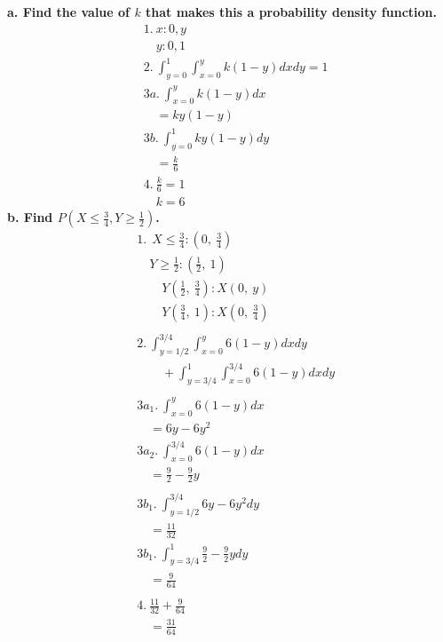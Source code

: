 \documentclass[
	a4paper, %
	10pt, %
	unnumberedsections, %
	twoside, %
]{LTJournalArticle}
\begin{document}
\textbf{a. Find the value of $k$ that makes this a probability density function.}
\begin{equation*}
    \begin{aligned}
    &1. \ x: 0, y \\
    &{\quad} y: 0, 1 \\
    &2. \ \int_{y = 0}^1 \int_{x = 0}^y k(1 - y)dxdy = 1 \\
    &3a. \  \int_{x = 0}^y k(1 - y)dx \\
    &{\quad} = ky(1 - y) \\
    &3b. \  \int_{y = 0}^1 ky(1 - y)dy \\
    &{\quad} = \frac{k}{6} \\
    &4. \  \frac{k}{6} = 1 \\
    &{\quad} k = 6
    \end{aligned}
\end{equation*}
\textbf{b. Find $P(X \le \frac{3}{4}, Y \ge \frac{1}{2})$.}
\begin{equation*}
    \begin{aligned}
    &1. \ \ X \le \frac{3}{4}: \left( 0, \ \frac{3}{4} \right) \\
    &{\quad} Y \ge \frac{1}{2}: \left( \frac{1}{2}, \ 1 \right) \\
    &{\quad \quad} Y \left( \frac{1}{2}, \ \frac{3}{4} \right): X \left( 0, \ y \right) \\
    &{\quad \quad} Y \left( \frac{3}{4}, \ 1 \right): X \left( 0, \ \frac{3}{4} \right) \\ \\
    &2. \ \int_{y = 1/2}^{3/4} \int_{x = 0}^{y} 6(1 - y) dxdy \\
    &{\quad \quad} + \int_{y = 3/4}^{1} \int_{x = 0}^{3/4} 6(1 - y) dxdy \\ \\
    &3a_1. \ \int_{x = 0}^{y} 6(1 - y) dx \\
    &{\quad} = 6y - 6y^2 \\
    &3a_2. \ \int_{x = 0}^{3/4} 6(1 - y) dx \\
    &{\quad} = \frac{9}{2} - \frac{9}{2}y \\ \\
    &3b_1. \ \int_{y = 1/2}^{3/4} 6y - 6y^2 dy \\
    &{\quad} = \frac{11}{32} \\
    &3b_1. \ \int_{y = 3/4}^{1} \frac{9}{2} - \frac{9}{2}y dy \\
    &{\quad} = \frac{9}{64} \\ \\
    &4. \ \frac{11}{32} + \frac{9}{64} \\
    &{\quad} = \frac{31}{64} \\
    \end{aligned}
\end{equation*}
\vspace*{1pt}\noindent
\end{document}
